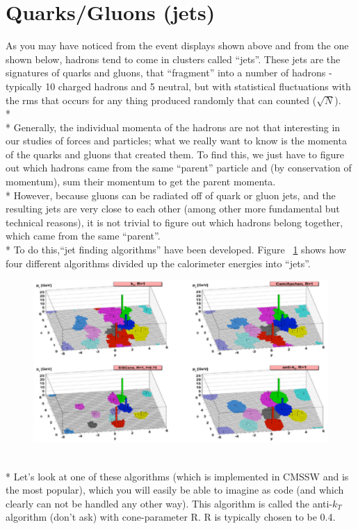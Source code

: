 \section{Quarks/Gluons (jets)}
As you may have noticed from the event displays shown above and from the one shown below, hadrons tend to come in clusters called ``jets''. These jets are the signatures of quarks and gluons, that ``fragment'' into a number of hadrons - typically 10 charged hadrons and 5 neutral, but with statistical fluctuations with the rms that occurs for any thing produced randomly that can counted ($\sqrt{N}$).
\\*
\\*
Generally, the individual momenta of the hadrons are not that interesting in our studies of forces and particles; what we really want to know is the momenta of the quarks and gluons that created them. To find this, we just have to figure out which hadrons came from the same ``parent'' particle and (by conservation of momentum), sum their momentum to get the parent momenta.
\\*
\noindent
However, because gluons can be radiated off of quark or gluon jets, and the resulting jets are very close to each other (among other more fundamental but technical reasons), it is not trivial to figure out which hadrons belong together, which came from the same ``parent''.
\\*
To do this,``jet finding algorithms'' have been developed. Figure ~\ref{fig:pid5} shows how four different algorithms divided up the calorimeter energies into ``jets''.
\begin{figure}[h]
\centering\includegraphics[scale=0.6]{./particleID/Pictures/fig5.pdf}
\label{fig:pid5}
\end{figure}
\\*
\noindent
Let's look at one of these algorithms (which is implemented in CMSSW and is the most popular), which you will easily be able to imagine as code (and which clearly can not be handled any other way). This algorithm is called the anti-$k_{T}$ algorithm (don't ask) with cone-parameter R. R is typically chosen to be 0.4.
